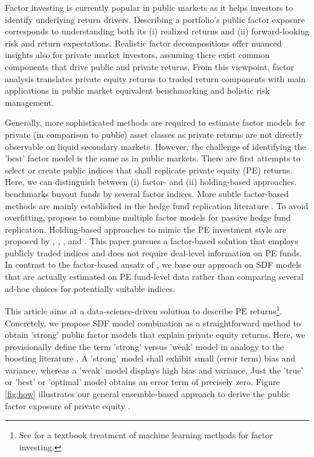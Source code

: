 \documentclass[12pt]{article}
\begin{document}
Factor investing is currently popular in public markets as it helps investors to identify underlying return drivers.
Describing a portfolio's public factor exposure corresponds to understanding both its (i) realized returns and (ii) forward-looking risk and return expectations.
Realistic factor decompositions offer nuanced insights also for private market investors, assuming there exist common components that drive public and private returns.
From this viewpoint, factor analysis translates private equity returns to traded return components with main applications in public market equivalent benchmarking and holistic risk management.

Generally, more sophisticated methods are required to estimate factor models for private (in comparison to public) asset classes as private returns are not directly observable on liquid secondary markets.
However, the challenge of identifying the 'best' factor model is the same as in public markets.
There are first attempts to select or create public indices that shall replicate private equity (PE) returns.
Here, we can distinguish between (i) factor- and (ii) holding-based approaches.
\cite{P14} benchmarks buyout funds by several factor indices.
More subtle factor-based methods are mainly established in the hedge fund replication literature \citep{TV08,W14}.
To avoid overfitting, \cite{OST17} propose to combine multiple factor models for passive hedge fund replication.
Holding-based approaches to mimic the PE investment style are proposed by \cite{LSSL16}, \cite{S17}, \cite{MS19}, and \cite{PP19}.
This paper pursues a factor-based solution that employs publicly traded indices and does not require deal-level information on PE funds.
In contrast to the factor-based ansatz of \cite{P14}, we base our approach on SDF models that are actually estimated on PE fund-level data rather than comparing several ad-hoc choices for potentially suitable indices.

This article aims at a data-science-driven solution to describe PE returns\footnote{See \cite{CG23} for a textbook treatment of machine learning methods for factor investing.}.
Concretely, we propose SDF model combination as a straightforward method to obtain 'strong' public factor models that explain private equity returns.
Here, we provisionally define the term 'strong' versus 'weak' model in analogy to the boosting literature \citep{S90}.
A 'strong' model shall exhibit small (error term) bias and variance, whereas a 'weak' model displays high bias and variance.
Just the 'true' or 'best' or 'optimal' model obtains an error term of precisely zero.
Figure \ref{fig:how} illustrates our general ensemble-based approach to derive the public factor exposure of private equity \citep{B12}.
\end{document}
